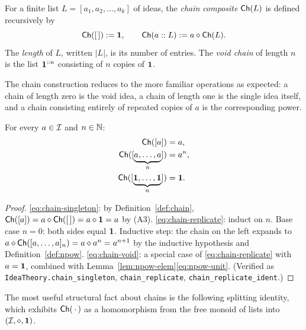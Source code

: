 \begin{definition}\label{def:chain}
For a finite list $L = [a_1, a_2, \dots, a_k]$ of ideas, the
\emph{chain composite} $\mathsf{Ch}(L)$ is defined recursively by
\begin{equation}\label{eq:chain-def}
\mathsf{Ch}([\,]) \mathrel{:=} \mathbf{1},
\qquad
\mathsf{Ch}(a :: L) \mathrel{:=} a \mathbin{\diamond} \mathsf{Ch}(L).
\end{equation}
The \emph{length} of $L$, written $|L|$, is its number of entries.  The
\emph{void chain} of length $n$ is the list $\mathbf{1}^{::n}$ consisting of
$n$ copies of $\mathbf{1}$.
\end{definition}

The chain construction reduces to the more familiar operations as
expected: a chain of length zero is the void idea, a chain of length one
is the single idea itself, and a chain consisting entirely of repeated
copies of $a$ is the corresponding power.

\begin{lemma}\label{lem:chain-basic}
For every $a \in \mathcal{I}$ and $n \in \mathbb{N}$:
\begin{align}
\mathsf{Ch}([a]) &= a,
\label{eq:chain-singleton} \\
\mathsf{Ch}([\underbrace{a,\dots,a}_{n}]) &= a^n,
\label{eq:chain-replicate} \\
\mathsf{Ch}([\underbrace{\mathbf{1},\dots,\mathbf{1}}_{n}]) &= \mathbf{1}.
\label{eq:chain-void}
\end{align}
\end{lemma}

\begin{proof}
\eqref{eq:chain-singleton}: by Definition~\ref{def:chain},
$\mathsf{Ch}([a]) = a \mathbin{\diamond} \mathsf{Ch}([\,]) = a \mathbin{\diamond} \mathbf{1} = a$ by (A3).
\eqref{eq:chain-replicate}: induct on $n$.  Base case $n=0$: both sides
equal $\mathbf{1}$.  Inductive step: the chain on the left expands to
$a \mathbin{\diamond} \mathsf{Ch}([a,\dots,a]_{n}) = a \mathbin{\diamond} a^n = a^{n+1}$ by
the inductive hypothesis and Definition~\ref{def:npow}.
\eqref{eq:chain-void}: a special case of \eqref{eq:chain-replicate} with
$a = \mathbf{1}$, combined with Lemma~\ref{lem:npow-elem}\eqref{eq:npow-unit}.
(Verified as \texttt{IdeaTheory.chain\_singleton},
\texttt{chain\_replicate}, \texttt{chain\_replicate\_ident}.)
\end{proof}

The most useful structural fact about chains is the following splitting
identity, which exhibits $\mathsf{Ch}(\,\cdot\,)$ as a homomorphism from the
free monoid of lists into $(\mathcal{I},\mathbin{\diamond},\mathbf{1})$.

